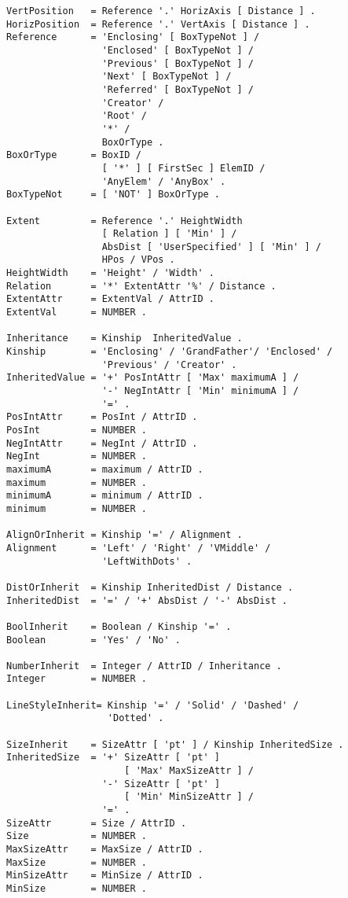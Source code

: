 \begin{verbatim}
VertPosition   = Reference '.' HorizAxis [ Distance ] .
HorizPosition  = Reference '.' VertAxis [ Distance ] .
Reference      = 'Enclosing' [ BoxTypeNot ] /
                 'Enclosed' [ BoxTypeNot ] /
                 'Previous' [ BoxTypeNot ] /
                 'Next' [ BoxTypeNot ] /
                 'Referred' [ BoxTypeNot ] /
                 'Creator' /
                 'Root' /
                 '*' /
                 BoxOrType .
BoxOrType      = BoxID /
                 [ '*' ] [ FirstSec ] ElemID /
                 'AnyElem' / 'AnyBox' .
BoxTypeNot     = [ 'NOT' ] BoxOrType .

Extent         = Reference '.' HeightWidth
                 [ Relation ] [ 'Min' ] /
                 AbsDist [ 'UserSpecified' ] [ 'Min' ] /
                 HPos / VPos .
HeightWidth    = 'Height' / 'Width' .
Relation       = '*' ExtentAttr '%' / Distance .
ExtentAttr     = ExtentVal / AttrID .
ExtentVal      = NUMBER .

Inheritance    = Kinship  InheritedValue .
Kinship        = 'Enclosing' / 'GrandFather'/ 'Enclosed' /
                 'Previous' / 'Creator' .
InheritedValue = '+' PosIntAttr [ 'Max' maximumA ] /
                 '-' NegIntAttr [ 'Min' minimumA ] /
                 '=' .
PosIntAttr     = PosInt / AttrID .
PosInt         = NUMBER .
NegIntAttr     = NegInt / AttrID .
NegInt         = NUMBER .
maximumA       = maximum / AttrID .
maximum        = NUMBER .
minimumA       = minimum / AttrID .
minimum        = NUMBER .

AlignOrInherit = Kinship '=' / Alignment .
Alignment      = 'Left' / 'Right' / 'VMiddle' /
                 'LeftWithDots' .

DistOrInherit  = Kinship InheritedDist / Distance .
InheritedDist  = '=' / '+' AbsDist / '-' AbsDist .

BoolInherit    = Boolean / Kinship '=' .
Boolean        = 'Yes' / 'No' .

NumberInherit  = Integer / AttrID / Inheritance .
Integer        = NUMBER .

LineStyleInherit= Kinship '=' / 'Solid' / 'Dashed' /
                  'Dotted' .

SizeInherit    = SizeAttr [ 'pt' ] / Kinship InheritedSize .
InheritedSize  = '+' SizeAttr [ 'pt' ]
                     [ 'Max' MaxSizeAttr ] /
                 '-' SizeAttr [ 'pt' ]
                     [ 'Min' MinSizeAttr ] /
                 '=' .
SizeAttr       = Size / AttrID .
Size           = NUMBER .
MaxSizeAttr    = MaxSize / AttrID .
MaxSize        = NUMBER .
MinSizeAttr    = MinSize / AttrID .
MinSize        = NUMBER .


\end{verbatim}
